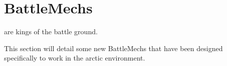 \documentclass{tufte-book}
\begin{document}
\chapter{BattleMechs}
\label{ch:battlemechs}


 are kings of the battle ground. 

This section will detail some new BattleMechs that have been
designed specifically to work in the arctic environment.

\clearpage








\backmatter

% 
% 


\printindex
\end{document}
